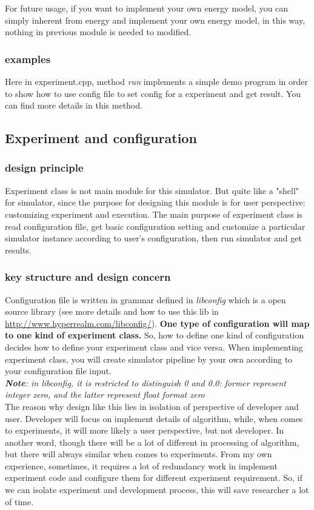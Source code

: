 \documentclass[11pt, oneside]{article}
\begin{document}
For future usage, if you want to implement your own energy model, you can simply inherent from energy and implement your own energy model, in this way, nothing in previous module is needed to modified.


\subsubsection{examples}
Here in experiment.cpp, method \textit{run} implements a simple demo program in order to show how to use config file to set config for a experiment and get result. You can find more details in this method.\\

\subsection{Experiment and configuration}
\subsubsection{design principle}
Experiment class is not main module for this simulator. But quite like a "shell" for simulator, since the purpose for designing this module is for user perspective: customizing experiment and execution. The main purpose of experiment class is read configuration file, get basic configuration setting and customize a particular simulator instance according to user's configuration, then run simulator and get results.

\subsubsection{key structure and design concern}
Configuration file is written in grammar defined in \textit{libconfig} which is a open source library (see more details and how to use this lib in \underline{http://www.hyperrealm.com/libconfig/}). \textbf{One type of configuration will map to one kind of experiment class.} So, how to define one kind of configuration decides how to define your experiment class and vice versa. When implementing experiment class, you will create simulator pipeline by your own according to your configuration file input. \\
\textit{\textbf{Note}: in \textit{libconfig}, it is restricted to distinguish 0 and 0.0: former represent integer zero, and the latter represent float format zero}\\

The reason why design like this lies in isolation of perspective of developer and user. Developer will focus on implement details of algorithm, while, when comes to experiments, it will more likely a user perspective, but not developer. In another word, though there will be a lot of different in processing of algorithm, but there will always similar when comes to experiments. From my own experience, sometimes, it requires a lot of redundancy work in implement experiment code and configure them for different experiment requirement. So, if we can isolate experiment and development process, this will save researcher a lot of time.\\
\end{document}
